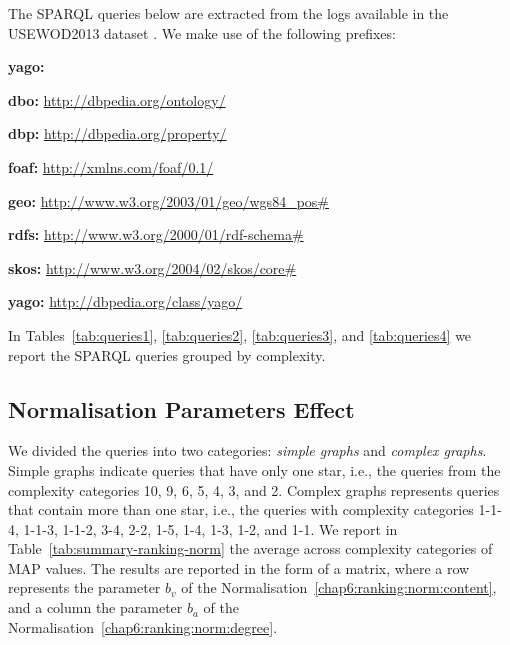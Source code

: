 The SPARQL queries below are extracted from the logs available in the USEWOD2013 dataset \cite{usewod:2013}. We make use of the following prefixes:
\begin{labeling}{\textbf{yago:}}
	\item[\textbf{dbo:}] \url{http://dbpedia.org/ontology/}
	\item[\textbf{dbp:}] \url{http://dbpedia.org/property/}
	\item[\textbf{foaf:}] \url{http://xmlns.com/foaf/0.1/}
	\item[\textbf{geo:}] \url{http://www.w3.org/2003/01/geo/wgs84\_pos#}
	\item[\textbf{rdfs:}] \url{http://www.w3.org/2000/01/rdf-schema#}
	\item[\textbf{skos:}] \url{http://www.w3.org/2004/02/skos/core#}
	\item[\textbf{yago:}] \url{http://dbpedia.org/class/yago/}
\end{labeling}

In Tables~\ref{tab:queries1}, \ref{tab:queries2}, \ref{tab:queries3}, and \ref{tab:queries4} we report the SPARQL queries grouped by complexity.









\subsection{Normalisation Parameters Effect}

We divided the queries into two categories: \emph{simple graphs} and \emph{complex graphs}. Simple graphs indicate queries that have only one star, i.e., the queries from the complexity categories 10, 9, 6, 5, 4, 3, and 2. Complex graphs represents queries that contain more than one star, i.e., the queries with complexity categories 1-1-4, 1-1-3, 1-1-2, 3-4, 2-2, 1-5, 1-4, 1-3, 1-2, and 1-1. We report in Table~\ref{tab:summary-ranking-norm} the average across complexity categories of MAP values. The results are reported in the form of a matrix, where a row represents the parameter $b_v$ of the Normalisation~\ref{chap6:ranking:norm:content}, and a column the parameter $b_a$ of the Normalisation~\ref{chap6:ranking:norm:degree}.

